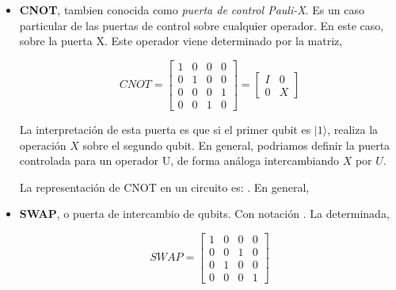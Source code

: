  \begin{itemize}
     \item \textbf{CNOT}, tambien conocida como \textit{puerta de control Pauli-X}. Es un caso particular de las puertas de control sobre cualquier operador. En este caso, sobre la puerta X. \newline 
     Este operador viene determinado por la matriz, 
     
     \begin{equation*}
     CNOT = \begin{bmatrix} 1 & 0 & 0 & 0\\0 & 1 & 0 & 0\\0 & 0 & 0 & 1\\0 & 0 & 1 & 0 \end{bmatrix}=\begin{bmatrix} I & 0  \\ 0 & X \end{bmatrix}
     \end{equation*}
     
     La interpretación de esta puerta es que si el primer qubit es $|1\rangle$, realiza la operación $X$ sobre el segundo qubit. En general, podriamos definir la puerta controlada para un operador U, de forma análoga intercambiando $X$ por $U$.\newline 
     
     La representación de CNOT en un circuito es: 
     . En general,
     
     \item \textbf{SWAP}, o puerta de intercambio de qubits. Con notación  . La determinada,
     
     \begin{equation*}
     SWAP = \begin{bmatrix}
         1 & 0 & 0 & 0 \\ 0 & 0 & 1 & 0 \\ 0 & 1 & 0 & 0 \\ 0 & 0 & 0 & 1
     \end{bmatrix} \end{equation*}
     

\end{itemize}

